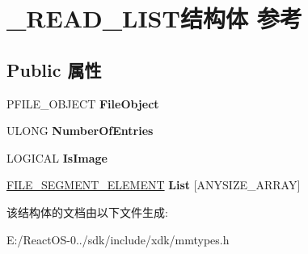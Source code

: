 \hypertarget{struct___r_e_a_d___l_i_s_t}{}\section{\+\_\+\+R\+E\+A\+D\+\_\+\+L\+I\+S\+T结构体 参考}
\label{struct___r_e_a_d___l_i_s_t}
\subsection*{Public 属性}
\begin{DoxyCompactItemize}
\item 
\mbox{\label{struct___r_e_a_d___l_i_s_t_a22a6e13372d018d45e4af3432baa6008}} 
P\+F\+I\+L\+E\+\_\+\+O\+B\+J\+E\+CT {\bfseries File\+Object}
\item 
\mbox{\label{struct___r_e_a_d___l_i_s_t_aae77bb98271d4ef7d595a51650d3152f}} 
U\+L\+O\+NG {\bfseries Number\+Of\+Entries}
\item 
\mbox{\label{struct___r_e_a_d___l_i_s_t_aee7f762a914240b5a39d92f54b415dfa}} 
L\+O\+G\+I\+C\+AL {\bfseries Is\+Image}
\item 
\mbox{\label{struct___r_e_a_d___l_i_s_t_a72b8d8bae94aec2fde3a4ecfe5a8f7c1}} 
\hyperlink{union___f_i_l_e___s_e_g_m_e_n_t___e_l_e_m_e_n_t}{F\+I\+L\+E\+\_\+\+S\+E\+G\+M\+E\+N\+T\+\_\+\+E\+L\+E\+M\+E\+NT} {\bfseries List} \mbox{[}A\+N\+Y\+S\+I\+Z\+E\+\_\+\+A\+R\+R\+AY\mbox{]}
\end{DoxyCompactItemize}


该结构体的文档由以下文件生成\+:\begin{DoxyCompactItemize}
\item 
E\+:/\+React\+O\+S-\/0../sdk/include/xdk/mmtypes.\+h\end{DoxyCompactItemize}
